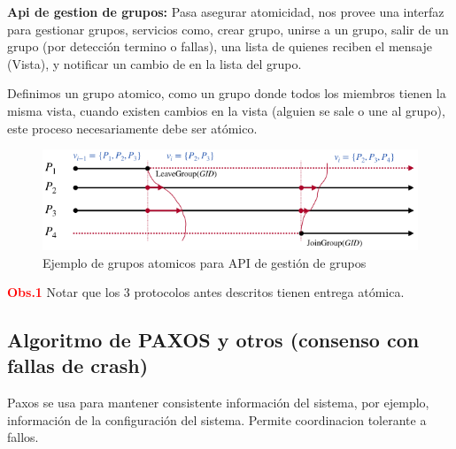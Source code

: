\textbf{Api de gestion de grupos:} Pasa asegurar atomicidad, nos provee una interfaz para gestionar grupos, servicios como, crear grupo, unirse a un grupo, salir de un grupo (por detección termino o fallas), una lista de quienes reciben el mensaje (Vista), y notificar un cambio de en la lista del grupo.

Definimos un grupo atomico, como un grupo donde todos los miembros tienen la misma vista, cuando existen cambios en la vista (alguien se sale o une al grupo), este proceso necesariamente debe ser atómico.

\begin{figure}[H]
    \centering
    \includegraphics[width=1.0\linewidth]{img/Api_gestion.png}
    \caption{Ejemplo de grupos atomicos para API de gestión de grupos}\label{fig:1761676301300}
\end{figure}

\textcolor{red}{\textbf{Obs.1}} Notar que los 3 protocolos antes descritos tienen entrega atómica.


\subsection{Algoritmo de PAXOS y otros (consenso con fallas de crash)}

Paxos se usa para mantener consistente información del sistema, por ejemplo, información de la configuración del sistema. Permite coordinacion tolerante a fallos.